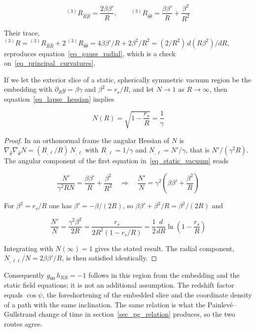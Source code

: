 \documentclass[anonymous]{iopjournal}
\begin{document}
\begin{equation}
    {}^{(3)}\!R_{\hat R\hat R}=\frac{2\beta\beta'}{R},
    \qquad
    {}^{(3)}\!R_{\hat\theta\hat\theta}=\frac{\beta\beta'}{R}+\frac{\beta^2}{R^2}
\end{equation}

Their trace, ${}^{(3)}\!R={}^{(3)}\!R_{\hat R\hat R}+2\,{}^{(3)}\!R_{\hat\theta\hat\theta}=4\beta\beta'/R+2\beta^2/R^2=(2/R^2)\,d(R\beta^2)/dR$, reproduces equation~\eqref{eq_gauss_radial}, which is a check on~\eqref{eq_principal_curvatures}.

If we let the exterior slice of a static, spherically symmetric vacuum region be the embedding with $\partial_Ry=\beta\gamma$ and $\beta^2=r_s/R$, and let $N\to1$ as $R\to\infty$, then equation~\eqref{eq_lapse_hessian} implies

\begin{equation}
    N(R)=\sqrt{1-\frac{r_s}{R}}=\frac{1}{\gamma}
\end{equation}

\begin{proof}
In an orthonormal frame the angular Hessian of $N$ is $\nabla_{\hat\theta}\nabla_{\hat\theta}N=(R_{,\ell}/R)\,N_{,\ell}$ with $R_{,\ell}=1/\gamma$ and $N_{,\ell}=N'/\gamma$, that is $N'/(\gamma^2R)$. The angular component of the first equation in~\eqref{eq_static_vacuum} reads

\begin{equation}
    \frac{N'}{\gamma^2RN}=\frac{\beta\beta'}{R}+\frac{\beta^2}{R^2}
    \quad\Longrightarrow\quad
    \frac{N'}{N}=\gamma^2\left(\beta\beta'+\frac{\beta^2}{R}\right)
\end{equation}

For $\beta^2=r_s/R$ one has $\beta'=-\beta/(2R)$, so $\beta\beta'+\beta^2/R=\beta^2/(2R)$ and

\begin{equation}
    \frac{N'}{N}=\frac{\gamma^2\beta^2}{2R}=\frac{r_s}{2R^2\left(1-r_s/R\right)}=\frac12\frac{d}{dR}\ln\!\left(1-\frac{r_s}{R}\right)
\end{equation}

Integrating with $N(\infty)=1$ gives the stated result. The radial component, $N_{,\ell\ell}/N=2\beta\beta'/R$, is then satisfied identically.
\end{proof}

Consequently $g_{00}\,h_{RR}=-1$ follows in this region from the embedding and the static field equations; it is not an additional assumption. The redshift factor equals $\cos\psi$, the foreshortening of the embedded slice and the coordinate density of a path with the same inclination. The same relation is what the Painlev\'e--Gullstrand change of time in section~\ref{sec_pg_relation} produces, so the two routes agree.
\end{document}

